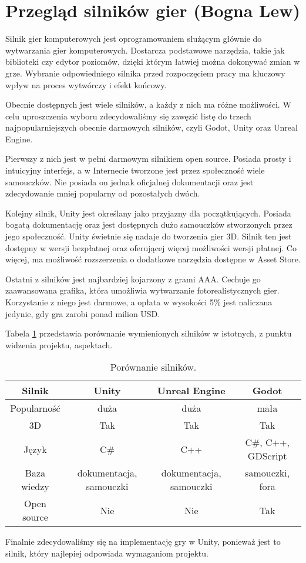 \section{Przegląd silników gier (Bogna Lew)}\label{s:silniki}
Silnik gier komputerowych jest oprogramowaniem służącym głównie do wytwarzania gier komputerowych. Dostarcza podstawowe
narzędzia, takie jak biblioteki czy edytor poziomów, dzięki którym łatwiej można dokonywać zmian w grze. Wybranie
odpowiedniego silnika przed rozpoczęciem pracy ma kluczowy wpływ na proces wytwórczy i efekt końcowy.

Obecnie dostępnych jest wiele silników, a każdy z nich ma różne możliwości. W celu uproszczenia wyboru zdecydowaliśmy
się zawęzić listę do trzech najpopularniejszych obecnie darmowych silników, czyli Godot, Unity oraz Unreal Engine.

Pierwszy z nich jest w pełni darmowym silnikiem open source. Posiada prosty i intuicyjny interfejs, a w Internecie
tworzone jest przez społeczność wiele samouczków. Nie posiada on jednak oficjalnej dokumentacji oraz jest zdecydowanie
mniej popularny od pozostałych dwóch.

Kolejny silnik, Unity jest określany jako przyjazny dla początkujących. Posiada bogatą dokumentację oraz jest dostępnych
dużo samouczków stworzonych przez jego społeczność. Unity świetnie się nadaje do tworzenia gier 3D. Silnik ten jest
dostępny w wersji bezpłatnej oraz oferującej więcej możliwości wersji płatnej. Co więcej, ma możliwość rozszerzenia
o dodatkowe narzędzia dostępne w Asset Store.

Ostatni z silników jest najbardziej kojarzony z grami AAA. Cechuje go zaawansowana grafika, która umożliwia wytwarzanie
fotorealistycznych gier. Korzystanie z niego jest darmowe, a opłata w wysokości 5\% jest naliczana jedynie, gdy gra
zarobi ponad milion USD.

Tabela \ref{fig:teng} przedstawia porównanie wymienionych silników w istotnych, z punktu widzenia projektu, aspektach.

\begin{table}[h]
\caption{Porównanie silników.}
\begin{center}
\begin{tabular}{ |c||c|c|c| }
 \hline
 Silnik & Unity & Unreal Engine & Godot \\
 \hline \hline
 Popularność & duża & duża & mała \\
 \hline
 3D & Tak & Tak & Tak \\
 \hline
 Język & C\# & C++ & C\#, C++, GDScript \\
 \hline
 Baza wiedzy & dokumentacja, samouczki & dokumentacja, samouczki & samouczki, fora \\
 \hline
 Open source & Nie & Nie & Tak \\
 \hline
\end{tabular}
\end{center}
\label{fig:teng} 
\end{table}

Finalnie zdecydowaliśmy się na implementację gry w Unity, ponieważ jest to silnik, który najlepiej odpowiada wymaganiom projektu.
